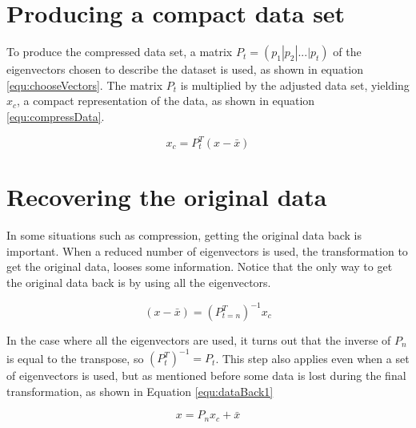 \section{Producing a compact data set}

To produce the compressed data set, a matrix $P_t =(p_1 | p_2 | ... | p_t)$ of the eigenvectors chosen to describe the dataset is used, as shown in equation \ref{equ:chooseVectors}.
The matrix $P_t$ is multiplied by the adjusted data set, yielding $x_c$, a compact representation of the data, as shown in equation \ref{equ:compressData}.

\begin{equation}
 x_c = P_t^T (x - \bar{x}) 
 \label{equ:compressData}
\end{equation}

\section{Recovering the original data}

In some situations such as compression, getting the original data back is important. 
When a reduced number of eigenvectors is used, 
the transformation to get the original data, looses some information.
Notice that the only way to get the original data back is by using all the eigenvectors.

\begin{equation}
 (x - \bar{x}) = (P_{t=n}^T)^{-1} x_c
 \label{equ:dataBack0}
\end{equation}

In the case where all the eigenvectors are used, it turns out that the inverse of $P_n$ is equal to the transpose, 
so $(P_{t}^T)^{-1} = P_t$.
This step also applies even when a set of eigenvectors is used, but as mentioned before
some data is lost during the final transformation, as shown in Equation \ref{equ:dataBack1}

\begin{equation}
 x = P_{n} x_c + \bar{x}
 \label{equ:dataBack1}
\end{equation}


